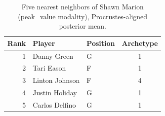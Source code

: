 \begin{table}[htbp]
  \centering\small
  \begin{tabular}{rllc}
    \toprule
    Rank & Player & Position & Archetype \\
    \midrule
    1 & Danny Green & G & 1 \\
    2 & Tari Eason & F & 1 \\
    3 & Linton Johnson & F & 4 \\
    4 & Justin Holiday & G & 1 \\
    5 & Carlos Delfino & G & 1 \\
    \bottomrule
  \end{tabular}
  \caption{Five nearest neighbors of Shawn Marion (peak_value modality), Procrustes-aligned posterior mean.}
  \label{tab:Shawn_Marion_neighbors_peak_value}
\end{table}

